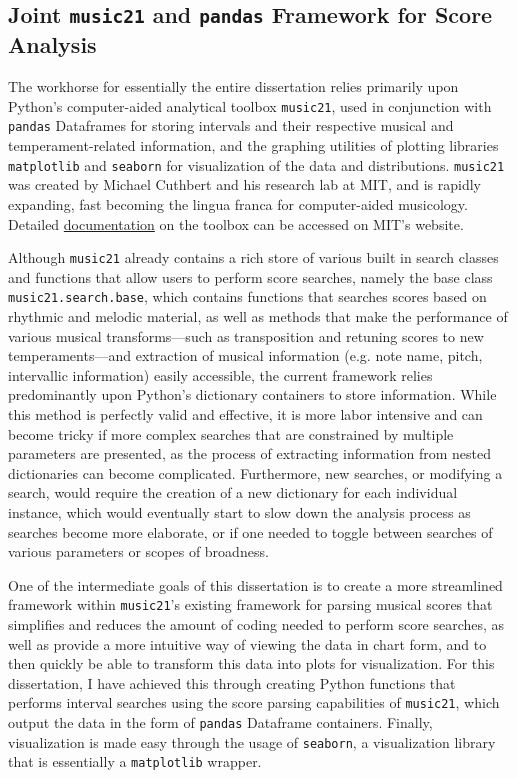    \subsection{\texorpdfstring{Joint \texttt{music21} and \texttt{pandas}
Framework for Score
Analysis}{Joint music21 and pandas Framework for Score Analysis}}\label{joint-music21-and-pandas-framework-for-score-analysis}

The workhorse for essentially the entire dissertation relies primarily
upon Python's computer-aided analytical toolbox \texttt{music21}, used
in conjunction with \texttt{pandas} Dataframes for storing intervals and
their respective musical and temperament-related information, and the
graphing utilities of plotting libraries \texttt{matplotlib} and
\texttt{seaborn} for visualization of the data and distributions.
\texttt{music21} was created by Michael Cuthbert and his research lab at
MIT, and is rapidly expanding, fast becoming the lingua franca for
computer-aided musicology. Detailed
\href{https://web.mit.edu/music21/}{documentation} on the toolbox can be
accessed on MIT's website.

Although \texttt{music21} already contains a rich store of various built
in search classes and functions that allow users to perform score
searches, namely the base class \texttt{music21.search.base}, which
contains functions that searches scores based on rhythmic and melodic
material, as well as methods that make the performance of various
musical transforms---such as transposition and retuning scores to
new temperaments---and extraction of musical information (e.g. note
name, pitch, intervallic information) easily accessible, the current
framework relies predominantly upon Python's dictionary containers to
store information. While this method is perfectly valid and effective,
it is more labor intensive and can become tricky if more complex
searches that are constrained by multiple parameters are presented, as
the process of extracting information from nested dictionaries can
become complicated. Furthermore, new searches, or modifying a search,
would require the creation of a new dictionary for each individual
instance, which would eventually start to slow down the analysis process
as searches become more elaborate, or if one needed to toggle between
searches of various parameters or scopes of broadness.

One of the intermediate goals of this dissertation is to create a more
streamlined framework within \texttt{music21}'s existing framework for
parsing musical scores that simplifies and reduces the amount of coding
needed to perform score searches, as well as provide a more intuitive
way of viewing the data in chart form, and to then quickly be able to
transform this data into plots for visualization. For this dissertation,
I have achieved this through creating Python functions that performs
interval searches using the score parsing capabilities of
\texttt{music21}, which output the data in the form of \texttt{pandas}
Dataframe containers. Finally, visualization is made easy through the
usage of \texttt{seaborn}, a visualization library that is essentially a
\texttt{matplotlib} wrapper.

